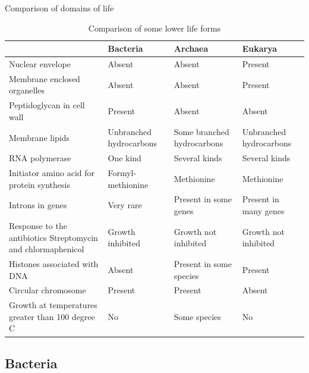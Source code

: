 \documentclass[ignorenonframetext,aspectratio=169]{beamer}
\begin{document}
\begin{frame}{Comparison of domains of life}
\protect\hypertarget{comparison-of-domains-of-life}{}

\begin{table}[t]

\caption{\label{tab:eu-arch-prokaryotic-cell}Comparison of some lower life forms}
\centering
\fontsize{6}{8}\selectfont
\begin{tabular}{>{\raggedright\arraybackslash}p{15em}>{\raggedright\arraybackslash}p{15em}>{\raggedright\arraybackslash}p{15em}l}
\toprule
  & Bacteria & Archaea & Eukarya\\
\midrule
\rowcolor{gray!6}  Nuclear envelope & Absent & Absent & Present\\
Membrane enclosed organelles & Absent & Absent & Present\\
\rowcolor{gray!6}  Peptidoglycan in cell wall & Present & Absent & Absent\\
Membrane lipids & Unbranched hydrocarbons & Some branched hydrocarbons & Unbranched hydrocarbons\\
\rowcolor{gray!6}  RNA polymerase & One kind & Several kinds & Several kinds\\
\addlinespace
Initiator amino acid for protein synthesis & Formyl-methionine & Methionine & Methionine\\
\rowcolor{gray!6}  Introns in genes & Very rare & Present in some genes & Present in many genes\\
Response to the antibiotics Streptomycin and chlormaphenicol & Growth inhibited & Growth not inhibited & Growth not inhibited\\
\rowcolor{gray!6}  Histones associated with DNA & Absent & Present in some species & Present\\
Circular chromosome & Present & Present & Absent\\
\addlinespace
\rowcolor{gray!6}  Growth at temperatures greater than 100 degree C & No & Some species & No\\
\bottomrule
\end{tabular}
\end{table}

\end{frame}

\hypertarget{bacteria}{%
\subsection{Bacteria}\label{bacteria}}
\end{document}
